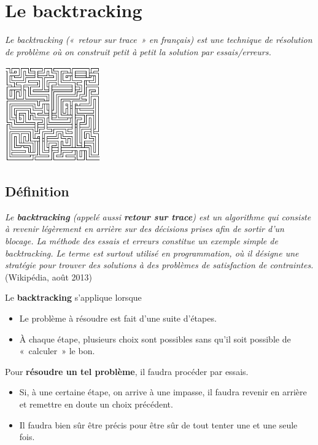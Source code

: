 \chapter{Le backtracking}

\begin{center}
	{\itshape Le backtracking («~retour sur trace~» en français) 
	est une technique de résolution de problème où on construit 
	petit à petit la solution par essais/erreurs.}
	
	\href{http://jamisbuck.org/images/maze7.png}
	{\includegraphics[width=4.094cm,height=4.094cm]{image/labyrinthe.png}}
\end{center}
	

\section{Définition}

	\textit{Le \textbf{backtracking} (appelé aussi \textbf{retour sur trace}) 
	est un algorithme qui consiste à revenir légèrement en arrière 
	sur des décisions prises afin de sortir d'un blocage. 	
	La méthode des essais et erreurs constitue un exemple simple de backtracking. 
	Le terme est surtout utilisé en programmation, où il désigne une stratégie 
	pour trouver des solutions à des problèmes de satisfaction de contraintes.} 
	(Wikipédia, août 2013)
	
	Le \textbf{backtracking} s'applique lorsque
	
	\begin{itemize}
		\item {
			Le problème à résoudre est fait d'une suite d'étapes.}
		\item {
			À chaque étape, plusieurs choix sont possibles 
			sans qu'il soit possible de «~calculer~» le bon.}
	\end{itemize}
	
	Pour \textbf{résoudre un tel problème}, il faudra procéder par essais.

	\begin{itemize}
		\item {
			Si, à une certaine étape, on arrive à une impasse, 
			il faudra revenir en arrière et remettre en doute un choix
			précédent.}
		\item {
			Il faudra bien sûr être précis pour être sûr 
			de tout tenter une et une seule fois.}
	\end{itemize}
	
